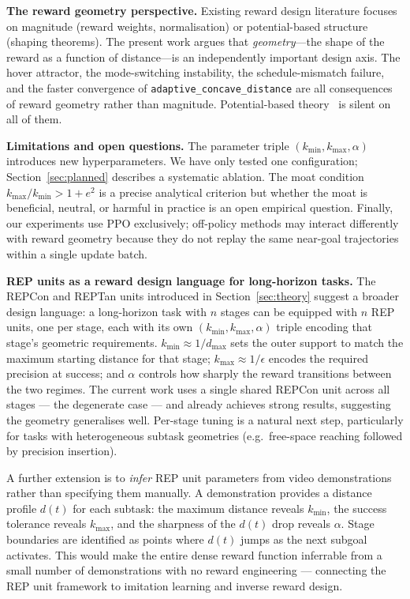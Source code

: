 \documentclass{article}
\begin{document}
\textbf{The reward geometry perspective.}
Existing reward design literature focuses on magnitude (reward weights, normalisation)
or potential-based structure (shaping theorems). The present work argues that
\emph{geometry}---the shape of the reward as a function of distance---is an
independently important design axis. The hover attractor, the mode-switching instability,
the schedule-mismatch failure, and the faster convergence of
\texttt{adaptive\_concave\_distance} are all consequences of reward geometry rather
than magnitude. Potential-based theory~\citep{ng1999shaping} is silent on all of them.

\textbf{Limitations and open questions.}
The parameter triple $(k_{\min}, k_{\max}, \alpha)$ introduces new hyperparameters.
We have only tested one configuration; Section~\ref{sec:planned} describes a systematic
ablation. The moat condition $k_{\max}/k_{\min} > 1+e^2$ is a precise analytical
criterion but whether the moat is beneficial, neutral, or harmful in practice is an
open empirical question. Finally, our experiments use PPO exclusively; off-policy
methods may interact differently with reward geometry because they do not replay the
same near-goal trajectories within a single update batch.

\textbf{REP units as a reward design language for long-horizon tasks.}
The REPCon and REPTan units introduced in Section~\ref{sec:theory} suggest a broader
design language: a long-horizon task with $n$ stages can be equipped with $n$ REP
units, one per stage, each with its own $(k_{\min}, k_{\max}, \alpha)$ triple encoding
that stage's geometric requirements. $k_{\min} \approx 1/d_{\max}$ sets the outer
support to match the maximum starting distance for that stage; $k_{\max} \approx
1/\epsilon$ encodes the required precision at success; and $\alpha$ controls how
sharply the reward transitions between the two regimes. The current work uses a single
shared REPCon unit across all stages --- the degenerate case --- and already achieves
strong results, suggesting the geometry generalises well. Per-stage tuning is a natural
next step, particularly for tasks with heterogeneous subtask geometries (e.g.\
free-space reaching followed by precision insertion).

A further extension is to \emph{infer} REP unit parameters from video demonstrations
rather than specifying them manually. A demonstration provides a distance profile
$d(t)$ for each subtask: the maximum distance reveals $k_{\min}$, the success
tolerance reveals $k_{\max}$, and the sharpness of the $d(t)$ drop reveals $\alpha$.
Stage boundaries are identified as points where $d(t)$ jumps as the next subgoal
activates. This would make the entire dense reward function inferrable from a small
number of demonstrations with no reward engineering --- connecting the REP unit
framework to imitation learning and inverse reward design.
\end{document}
